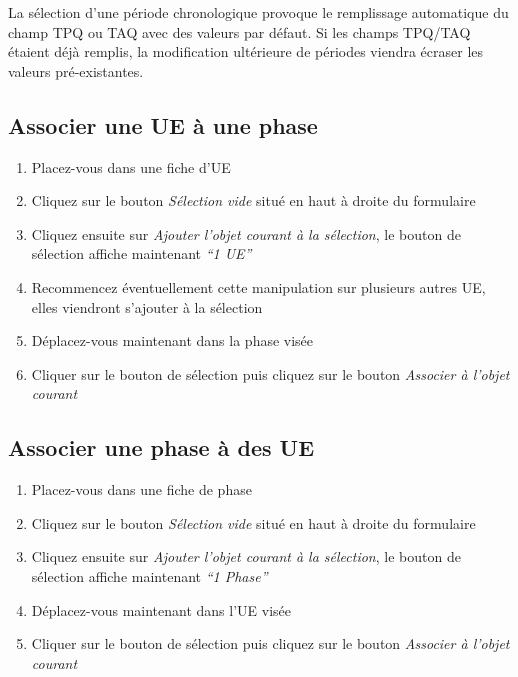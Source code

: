 \documentclass[letterpaper,10pt,french]{sphinxmanual}
\begin{document}
La sélection d'une période chronologique provoque le remplissage automatique du champ TPQ ou TAQ avec des valeurs par défaut. Si les champs TPQ/TAQ étaient déjà remplis, la modification ultérieure de périodes viendra écraser les valeurs pré-existantes.


\subsection{Associer une UE à une phase}
\label{manuel/formulaire_datation:associer-une-ue-a-une-phase}\begin{enumerate}
\item {} 
Placez-vous dans une fiche d'UE

\item {} 
Cliquez sur le bouton \emph{Sélection vide} situé en haut à droite du formulaire

\item {} 
Cliquez ensuite sur \emph{Ajouter l'objet courant à la sélection}, le bouton de sélection affiche maintenant \emph{``1 UE''}

\item {} 
Recommencez éventuellement cette manipulation sur plusieurs autres UE, elles viendront s'ajouter à la sélection

\item {} 
Déplacez-vous maintenant dans la phase visée

\item {} 
Cliquer sur le bouton de sélection puis cliquez sur le bouton \emph{Associer à l'objet courant}

\end{enumerate}


\subsection{Associer une phase à des UE}
\label{manuel/formulaire_datation:associer-une-phase-a-des-ue}\begin{enumerate}
\item {} 
Placez-vous dans une fiche de phase

\item {} 
Cliquez sur le bouton \emph{Sélection vide} situé en haut à droite du formulaire

\item {} 
Cliquez ensuite sur \emph{Ajouter l'objet courant à la sélection}, le bouton de sélection affiche maintenant \emph{``1 Phase''}

\item {} 
Déplacez-vous maintenant dans l'UE visée

\item {} 
Cliquer sur le bouton de sélection puis cliquez sur le bouton \emph{Associer à l'objet courant}

\end{enumerate}
\end{document}
